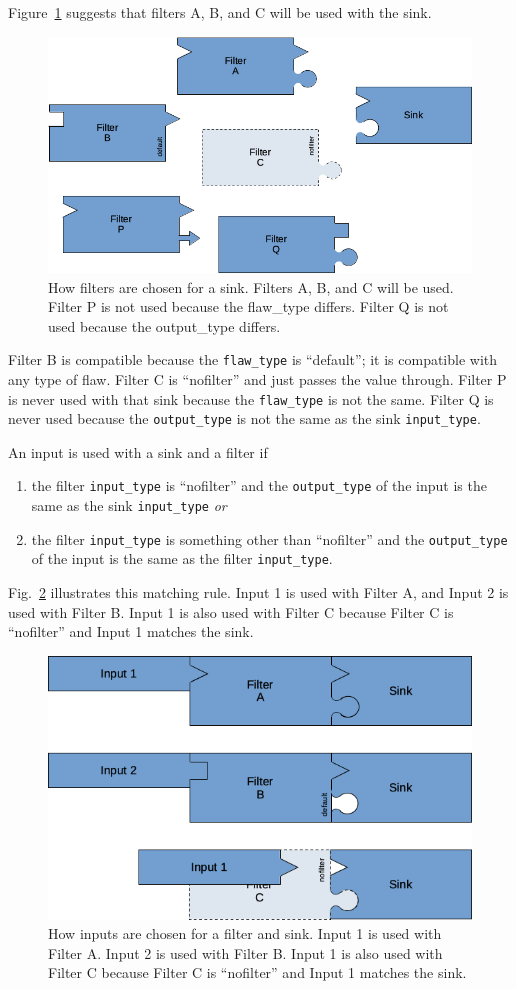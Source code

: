 \documentclass[12pt]{article}
\begin{document}
Figure~\ref{fig:how filters fit a sink} suggests that filters A, B, and C will
be used with the sink.
\begin{figure}[htbp]
  \centerline{\includegraphics[width=.8\linewidth]{fig_filters_and_sinks.png}}
  \caption{How filters are chosen for a sink.  Filters A, B, and C will be used.
    Filter P is not used because the flaw\_type differs.
    Filter Q is not used because the output\_type differs.
  }
  \label{fig:how filters fit a sink}
\end{figure}
Filter B is compatible because the \verb|flaw_type| is
``default''; it is compatible with any type of flaw.  Filter C is ``nofilter'' and
just passes the value through.  Filter P is never used with that sink because
the \verb|flaw_type| is not the same.
Filter Q is never used because the \verb|output_type| is not the same as the
sink \verb|input_type|.

An input is used with a sink and a filter if
\begin{enumerate}[nosep]
\item the filter \verb|input_type| is ``nofilter'' and the \verb|output_type|
  of the input is the same as the sink \verb|input_type| \emph{or}
\item the filter \verb|input_type| is something other than ``nofilter'' and the
  \verb|output_type| of the input is the same as the filter \verb|input_type|.
\end{enumerate}
Fig.~\ref{fig:how inputs fit} illustrates this matching rule.  Input 1 is used with
Filter A, and Input 2 is used with Filter B.  Input 1 is also used with Filter C
because Filter C is ``nofilter'' and Input 1 matches the sink.
\begin{figure}[htbp]
  \centerline{\includegraphics[width=.667\linewidth]{fig_inputs_filters_and_sinks.png}}
  \caption{How inputs are chosen for a filter and sink.  Input 1 is used with
    Filter A.  Input 2 is used with Filter B.  Input 1 is also used with Filter C
    because Filter C is ``nofilter'' and Input 1 matches the sink.
  }
  \label{fig:how inputs fit}
\end{figure}
\end{document}
